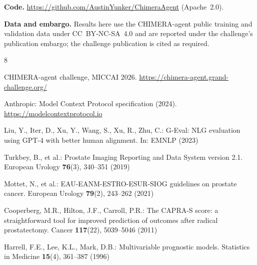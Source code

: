 \documentclass[runningheads]{llncs}
\begin{document}
\medskip
\noindent\textbf{Code.} \url{https://github.com/AustinYunker/ChimeraAgent}
(Apache~2.0).

\noindent\textbf{Data and embargo.} Results here use the CHIMERA-agent public
training and validation data under CC~BY-NC-SA~4.0 and are reported under the
challenge's publication embargo; the challenge publication is cited as required.

\begin{thebibliography}{8}

CHIMERA-agent challenge, MICCAI 2026.
\url{https://chimera-agent.grand-challenge.org/}

Anthropic: Model Context Protocol specification (2024).
\url{https://modelcontextprotocol.io}

Liu, Y., Iter, D., Xu, Y., Wang, S., Xu, R., Zhu, C.: G-Eval: NLG evaluation using
GPT-4 with better human alignment. In: EMNLP (2023)

Turkbey, B., et al.: Prostate Imaging Reporting and Data System version 2.1.
European Urology \textbf{76}(3), 340--351 (2019)

Mottet, N., et al.: EAU-EANM-ESTRO-ESUR-SIOG guidelines on prostate cancer.
European Urology \textbf{79}(2), 243--262 (2021)

Cooperberg, M.R., Hilton, J.F., Carroll, P.R.: The CAPRA-S score: a straightforward
tool for improved prediction of outcomes after radical prostatectomy.
Cancer \textbf{117}(22), 5039--5046 (2011)

Harrell, F.E., Lee, K.L., Mark, D.B.: Multivariable prognostic models.
Statistics in Medicine \textbf{15}(4), 361--387 (1996)

\end{thebibliography}
\end{document}
